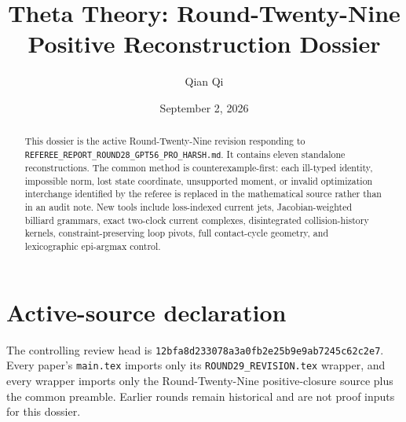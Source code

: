 \documentclass[11pt,reqno]{amsart}
\title{Theta Theory: Round-Twenty-Nine Positive Reconstruction Dossier}
\author{Qian Qi}
\date{September 2, 2026}
\begin{document}
\begin{abstract}
This dossier is the active Round-Twenty-Nine revision responding to
\texttt{REFEREE\_REPORT\_ROUND28\_GPT56\_PRO\_HARSH.md}.  It contains eleven
standalone reconstructions.  The common method is counterexample-first: each
ill-typed identity, impossible norm, lost state coordinate, unsupported
moment, or invalid optimization interchange identified by the referee is
replaced in the mathematical source rather than in an audit note.  New tools
include loss-indexed current jets, Jacobian-weighted billiard grammars, exact
two-clock current complexes, disintegrated collision-history kernels,
constraint-preserving loop pivots, full contact-cycle geometry, and
lexicographic epi-argmax control.
\end{abstract}
\maketitle
\tableofcontents

\section*{Active-source declaration}
The controlling review head is
\texttt{12bfa8d233078a3a0fb2e25b9e9ab7245c62c2e7}.  Every paper's
\texttt{main.tex} imports only its \texttt{ROUND29\_REVISION.tex} wrapper,
and every wrapper imports only the Round-Twenty-Nine positive-closure source
plus the common preamble.  Earlier rounds remain historical and are not proof
inputs for this dossier.

\clearpage

\clearpage

\clearpage

\clearpage

\clearpage

\clearpage

\clearpage

\clearpage

\clearpage

\clearpage

\clearpage

\end{document}
